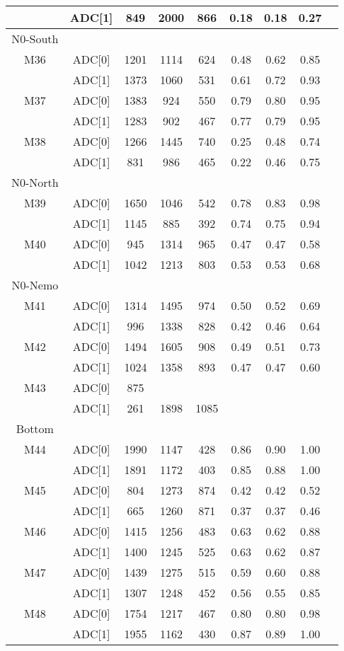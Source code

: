 \begin{longtable}{c c c c c c c c c}
      & ADC[1] & 849 & 2000 & 866 & 0.18 & 0.18 & 0.27\\
  \midrule
  N0-South\\
  \midrule
  M36 & ADC[0] & 1201 & 1114 & 624 & 0.48 & 0.62 & 0.85\\
      & ADC[1] & 1373 & 1060 & 531 & 0.61 & 0.72 & 0.93\\
  M37 & ADC[0] & 1383 & 924 & 550 & 0.79 & 0.80 & 0.95\\
      & ADC[1] & 1283 & 902 & 467 & 0.77 & 0.79 & 0.95\\
  M38 & ADC[0] & 1266 & 1445 & 740 & 0.25 & 0.48 & 0.74\\
      & ADC[1] & 831 & 986 & 465 & 0.22 & 0.46 & 0.75\\
  N0-North\\
  \midrule
  M39 & ADC[0] & 1650 & 1046 & 542 & 0.78 & 0.83 & 0.98\\
      & ADC[1] & 1145 & 885 & 392 & 0.74 & 0.75 & 0.94\\
  M40 & ADC[0] & 945 & 1314 & 965 & 0.47 & 0.47 & 0.58\\
      & ADC[1] & 1042 & 1213 & 803 & 0.53 & 0.53 & 0.68\\
  \midrule
  N0-Nemo\\
  \midrule
  M41 & ADC[0] & 1314 & 1495 & 974 & 0.50 & 0.52 & 0.69\\
      & ADC[1] & 996 & 1338 & 828 & 0.42 & 0.46 & 0.64\\
  M42 & ADC[0] & 1494 & 1605 & 908 & 0.49 & 0.51 & 0.73\\
      & ADC[1] & 1024 & 1358 & 893 & 0.47 & 0.47 & 0.60\\
  M43 & ADC[0] & 875 &  &  &   &   &  \\
      & ADC[1] & 261 & 1898 & 1085 &   &   &  \\
  \midrule
  Bottom\\
  \midrule
  M44 & ADC[0] & 1990 & 1147 & 428 & 0.86 & 0.90 & 1.00\\
   & ADC[1] & 1891 & 1172 & 403 & 0.85 & 0.88 & 1.00\\
  M45 & ADC[0] & 804 & 1273 & 874 & 0.42 & 0.42 & 0.52\\
   & ADC[1] & 665 & 1260 & 871 & 0.37 & 0.37 & 0.46\\
  M46 & ADC[0] & 1415 & 1256 & 483 & 0.63 & 0.62 & 0.88\\
   & ADC[1] & 1400 & 1245 & 525 & 0.63 & 0.62 & 0.87\\
  M47 & ADC[0] & 1439 & 1275 & 515 & 0.59 & 0.60 & 0.88\\
   & ADC[1] & 1307 & 1248 & 452 & 0.56 & 0.55 & 0.85\\
  M48 & ADC[0] & 1754 & 1217 & 467 & 0.80 & 0.80 & 0.98\\
   & ADC[1] & 1955 & 1162 & 430 & 0.87 & 0.89 & 1.00\\

  \bottomrule
\end{longtable}

\normalsize
